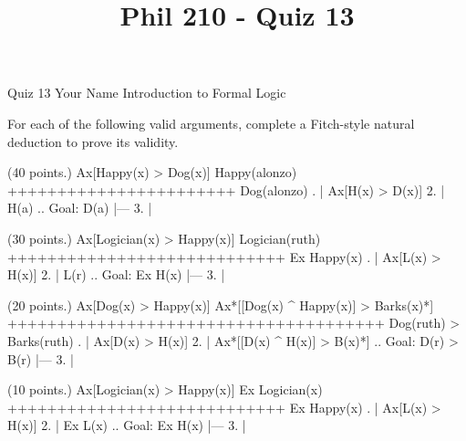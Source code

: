 
\title{Phil 210 - Quiz 13}

\heading
Quiz 13
Your Name
Introduction to Formal Logic
\endheading

For each of the following valid arguments, complete a Fitch-style natural deduction to prove its validity.

\quantifiers
\problems
{} (40 points.)
\argument
 Ax[Happy(x) > Dog(x)]
 Happy(alonzo) 
+++++++++++++++++++++++
 Dog(alonzo) 
\endargument
        \answer
        . | Ax[H(x) > D(x)]
         2. | H(a)             ..  Goal: D(a)
            |---
         3. | 
        \endfitchproof
        \endanswer

 (30 points.)
\argument
 Ax[Logician(x) > Happy(x)]
 Logician(ruth)
++++++++++++++++++++++++++++
 Ex Happy(x) 
\endargument
        \answer
        . | Ax[L(x) > H(x)]
         2. | L(r)             ..  Goal: Ex H(x)
            |---
         3. |
        \endfitchproof
        \endanswer

 (20 points.)
\argument
 Ax[Dog(x) > Happy(x)]
 Ax*[[Dog(x) ^ Happy(x)] > Barks(x)*]
++++++++++++++++++++++++++++++++++++++
 Dog(ruth) > Barks(ruth)
\endargument
        \answer
        . | Ax[D(x) > H(x)]
         2. | Ax*[[D(x) ^ H(x)] > B(x)*]  ..  Goal: D(r) > B(r)
            |---
         3. | 
        \endfitchproof
        \endanswer

 (10 points.)
\argument
 Ax[Logician(x) > Happy(x)]
 Ex Logician(x)
++++++++++++++++++++++++++++
 Ex Happy(x)
\endargument
        \answer
        . | Ax[L(x) > H(x)]
         2. | Ex L(x)          ..  Goal: Ex H(x)
            |---
         3. | 
        \endfitchproof
        \endanswer

\endproblems
\bye
